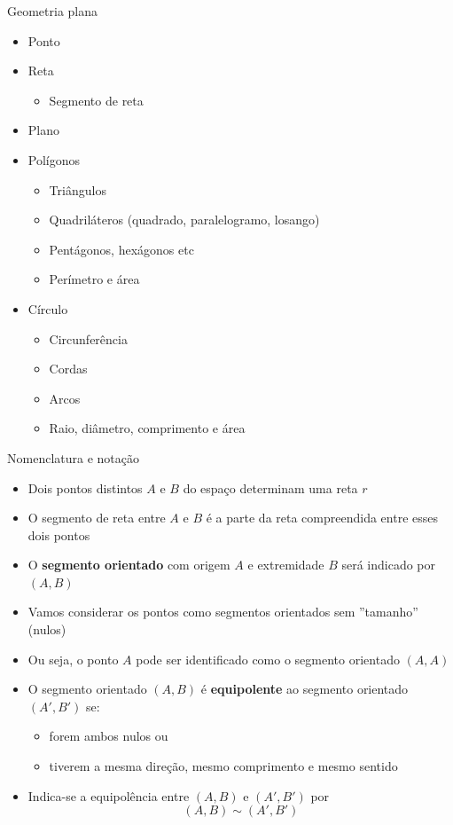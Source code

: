 \begin{frame}{Geometria plana}
    \begin{itemize}
        \item Ponto
        \item Reta
            \begin{itemize}
                \item Segmento de reta
            \end{itemize}
        \item Plano
        \item Polígonos
            \begin{itemize}
                \item Triângulos
                \item Quadriláteros (quadrado, paralelogramo, losango)
                \item Pentágonos, hexágonos etc
                \item<2> Perímetro e área
            \end{itemize}
        \item Círculo
            \begin{itemize}
                \item Circunferência
                \item Cordas
                \item Arcos
                \item<2> Raio, diâmetro, comprimento e área
            \end{itemize}
    \end{itemize}
\end{frame}

\begin{frame}{Nomenclatura e notação}
    \begin{itemize}[<+->]
        \item Dois pontos distintos \(A\) e \(B\) do espaço determinam uma reta \(r\)
        \item O segmento de reta entre \(A\) e \(B\) é a parte da reta compreendida entre esses dois pontos
        \item O \textbf{segmento orientado} com origem \(A\) e extremidade \(B\) será indicado por \((A,B)\)
        \item Vamos considerar os pontos como segmentos orientados sem ''tamanho'' (nulos)
        \item Ou seja, o ponto \(A\) pode ser identificado como o segmento orientado \((A,A)\)
        \item O segmento orientado \((A,B)\) é \textbf{equipolente} ao segmento orientado \((A',B')\) se:
            \begin{itemize}[<.->]
                \item forem ambos nulos ou
                \item tiverem a mesma direção, mesmo comprimento e mesmo sentido
            \end{itemize}
        \item Indica-se a equipolência entre \((A,B)\) e \((A',B')\) por
            \[
                (A,B) \sim (A',B')
            \]
    \end{itemize}
\end{frame}

